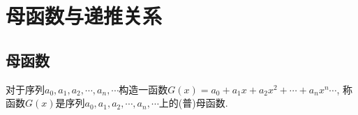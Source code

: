 \chapter{母函数与递推关系}

\section{母函数}

    \begin{definition}
        [(普)母函数]
        对于序列$a_0,a_1,a_2,\cdots,a_n,\cdots$构造一函数$G(x)=a_0+a_1x+a_2x^2+\cdots+a_nx^n\cdots$, 称函数$G(x)$是序列$a_0,a_1,a_2,\cdots,a_n,\cdots$上的\textsf{(普)母函数}.
    \end{definition}
